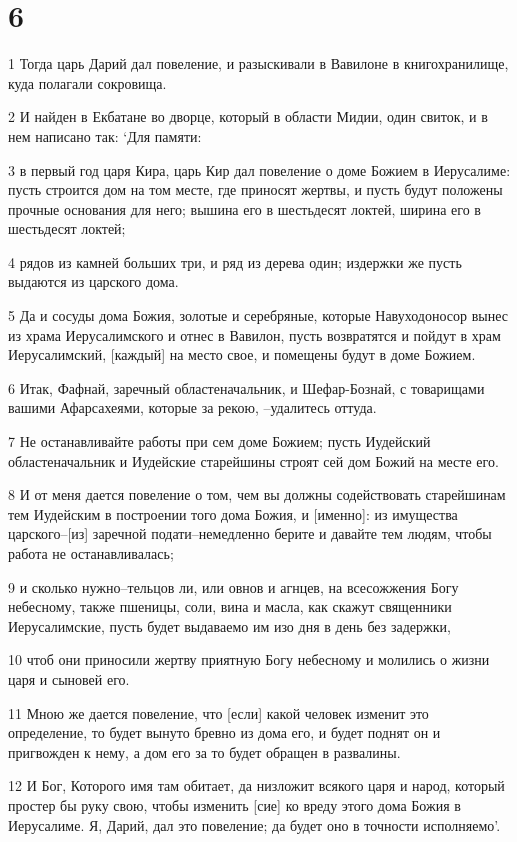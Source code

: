 \chapter{6}

\par 1 Тогда царь Дарий дал повеление, и разыскивали в Вавилоне в книгохранилище, куда полагали сокровища.
\par 2 И найден в Екбатане во дворце, который в области Мидии, один свиток, и в нем написано так: `Для памяти:
\par 3 в первый год царя Кира, царь Кир дал повеление о доме Божием в Иерусалиме: пусть строится дом на том месте, где приносят жертвы, и пусть будут положены прочные основания для него; вышина его в шестьдесят локтей, ширина его в шестьдесят локтей;
\par 4 рядов из камней больших три, и ряд из дерева один; издержки же пусть выдаются из царского дома.
\par 5 Да и сосуды дома Божия, золотые и серебряные, которые Навуходоносор вынес из храма Иерусалимского и отнес в Вавилон, пусть возвратятся и пойдут в храм Иерусалимский, [каждый] на место свое, и помещены будут в доме Божием.
\par 6 Итак, Фафнай, заречный областеначальник, и Шефар-Бознай, с товарищами вашими Афарсахеями, которые за рекою, --удалитесь оттуда.
\par 7 Не останавливайте работы при сем доме Божием; пусть Иудейский областеначальник и Иудейские старейшины строят сей дом Божий на месте его.
\par 8 И от меня дается повеление о том, чем вы должны содействовать старейшинам тем Иудейским в построении того дома Божия, и [именно]: из имущества царского--[из] заречной подати--немедленно берите и давайте тем людям, чтобы работа не останавливалась;
\par 9 и сколько нужно--тельцов ли, или овнов и агнцев, на всесожжения Богу небесному, также пшеницы, соли, вина и масла, как скажут священники Иерусалимские, пусть будет выдаваемо им изо дня в день без задержки,
\par 10 чтоб они приносили жертву приятную Богу небесному и молились о жизни царя и сыновей его.
\par 11 Мною же дается повеление, что [если] какой человек изменит это определение, то будет вынуто бревно из дома его, и будет поднят он и пригвожден к нему, а дом его за то будет обращен в развалины.
\par 12 И Бог, Которого имя там обитает, да низложит всякого царя и народ, который простер бы руку свою, чтобы изменить [сие] ко вреду этого дома Божия в Иерусалиме. Я, Дарий, дал это повеление; да будет оно в точности исполняемо'.
